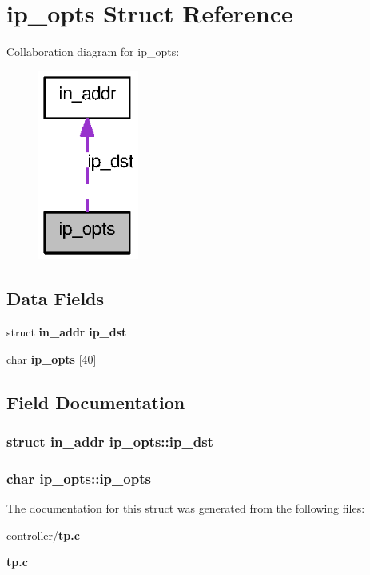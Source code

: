 \section{ip\_\-opts Struct Reference}
\label{structip__opts}


Collaboration diagram for ip\_\-opts:
\nopagebreak
\begin{figure}[H]
\begin{center}
\leavevmode
\includegraphics[width=94pt]{structip__opts__coll__graph}
\end{center}
\end{figure}
\subsection*{Data Fields}
\begin{DoxyCompactItemize}
\item 
struct {\bf in\_\-addr} {\bf ip\_\-dst}
\item 
char {\bf ip\_\-opts} [40]
\end{DoxyCompactItemize}


\subsection{Field Documentation}
\subsubsection[{ip\_\-dst}]{\setlength{\rightskip}{0pt plus 5cm}struct {\bf in\_\-addr} {\bf ip\_\-opts::ip\_\-dst}}\label{structip__opts_a13a05ac8c25f59f94629d0ea5def276f}
\subsubsection[{ip\_\-opts}]{\setlength{\rightskip}{0pt plus 5cm}char {\bf ip\_\-opts::ip\_\-opts}}\label{structip__opts_a17f0deb4fce721b76a8c1ea5118d8fe1}


The documentation for this struct was generated from the following files:\begin{DoxyCompactItemize}
\item 
controller/{\bf tp.c}\item 
{\bf tp.c}\end{DoxyCompactItemize}
